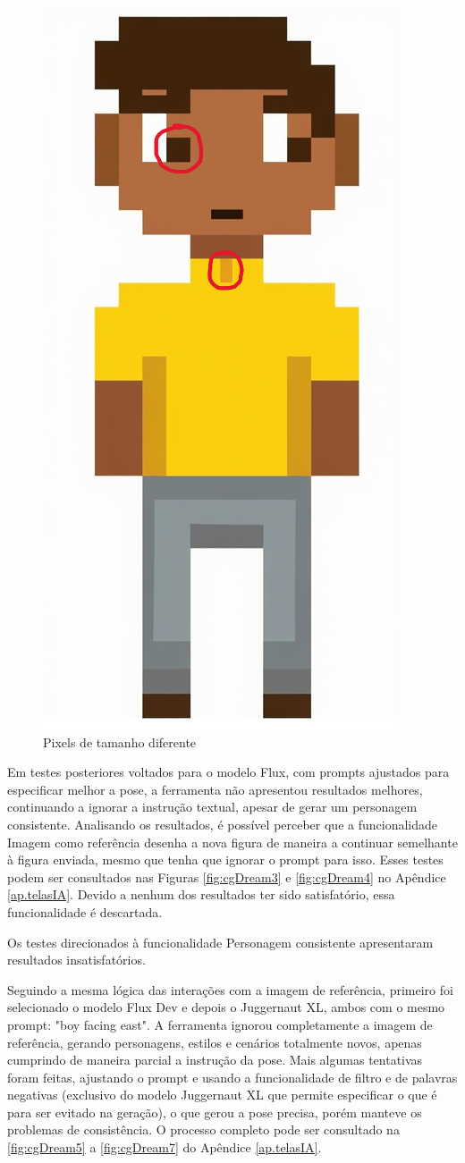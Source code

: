 \begin{figure}[htbp]
    \centering
    \caption{\small Pixels de tamanho diferente}
    \label{fig:CGDreamPixelPerfect}
    \includegraphics[width=0.3\linewidth]{figs/cgDream/pixel perfect.png}
\end{figure}

Em testes posteriores voltados para o modelo Flux, com prompts ajustados para especificar melhor a pose, a ferramenta não apresentou resultados melhores, continuando a ignorar a instrução textual, apesar de gerar um personagem consistente. Analisando os resultados, é possível perceber que a funcionalidade Imagem como referência desenha a nova figura de maneira a continuar semelhante à figura enviada, mesmo que tenha que ignorar o prompt para isso. Esses testes podem ser consultados nas Figuras \ref{fig:cgDream3} e \ref{fig:cgDream4} no Apêndice \ref{ap.telasIA}. Devido a nenhum dos resultados ter sido satisfatório, essa funcionalidade é descartada.

Os testes direcionados à funcionalidade Personagem consistente apresentaram resultados insatisfatórios. 


Seguindo a mesma lógica das interações com a imagem de referência, primeiro foi selecionado o modelo Flux Dev e depois o Juggernaut XL, ambos com o mesmo prompt: "boy facing east". A ferramenta ignorou completamente a imagem de referência, gerando personagens, estilos e cenários totalmente novos, apenas cumprindo de maneira parcial a instrução da pose. Mais algumas tentativas foram feitas, ajustando o prompt e usando a funcionalidade de filtro e de palavras negativas (exclusivo do modelo Juggernaut XL que permite especificar o que é para ser evitado na geração), o que gerou a pose precisa, porém manteve os problemas de consistência. O processo completo pode ser consultado na \ref{fig:cgDream5} a \ref{fig:cgDream7} do Apêndice \ref{ap.telasIA}.

